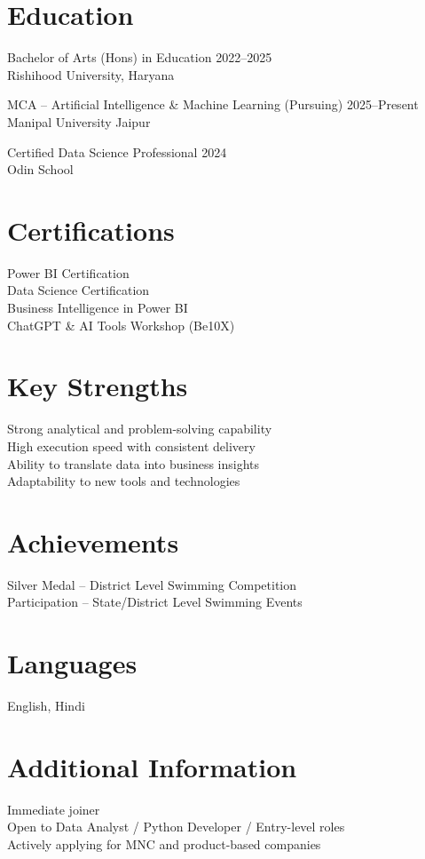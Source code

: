 \documentclass[letterpaper,11pt]{article}
\begin{document}
\section*{Education}
Bachelor of Arts (Hons) in Education \hfill 2022--2025\\
Rishihood University, Haryana

MCA -- Artificial Intelligence \& Machine Learning (Pursuing) \hfill 2025--Present\\
Manipal University Jaipur

Certified Data Science Professional \hfill 2024\\
Odin School

\section*{Certifications}
Power BI Certification\\
Data Science Certification\\
Business Intelligence in Power BI\\
ChatGPT \& AI Tools Workshop (Be10X)

\section*{Key Strengths}
Strong analytical and problem-solving capability\\
High execution speed with consistent delivery\\
Ability to translate data into business insights\\
Adaptability to new tools and technologies

\section*{Achievements}
Silver Medal -- District Level Swimming Competition\\
Participation -- State/District Level Swimming Events

\section*{Languages}
English, Hindi

\section*{Additional Information}
Immediate joiner\\
Open to Data Analyst / Python Developer / Entry-level roles\\
Actively applying for MNC and product-based companies
\end{document}
